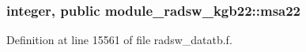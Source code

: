 \subsubsection[{\texorpdfstring{msa22}{msa22}}]{\setlength{\rightskip}{0pt plus 5cm}integer, public module\+\_\+radsw\+\_\+kgb22\+::msa22}\hypertarget{namespacemodule__radsw__kgb22_a4134c2cd3b31db5e0adb5c3c2ad87905}{}\label{namespacemodule__radsw__kgb22_a4134c2cd3b31db5e0adb5c3c2ad87905}


Definition at line 15561 of file radsw\+\_\+datatb.\+f.

